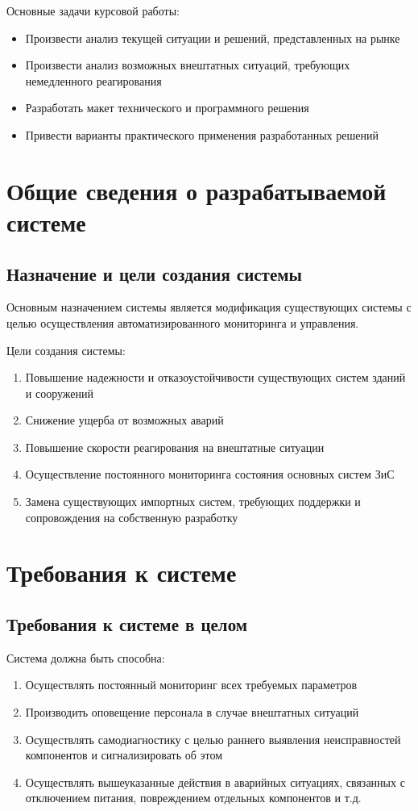 Основные задачи курсовой работы:
\begin{itemize}
	\itemsep0em 
	\item Произвести анализ текущей ситуации и решений, представленных на рынке
	\item Произвести анализ возможных внештатных ситуаций, требующих немедленного реагирования
	\item Разработать макет технического и программного решения
	\item Привести варианты практического применения разработанных решений 
\end{itemize}


\newpage\section{Общие сведения о разрабатываемой системе}
\subsection{Назначение и цели создания системы}
Основным назначением системы является модификация существующих системы с целью осуществления автоматизированного мониторинга и управления.

Цели создания системы:
\begin{enumerate}
	\itemsep0em 
	\item Повышение надежности и отказоустойчивости существующих систем зданий и сооружений
	\item Снижение ущерба от возможных аварий
	\item Повышение скорости реагирования на внештатные ситуации
	\item Осуществление постоянного мониторинга состояния основных систем ЗиС
	\item Замена существующих импортных систем, требующих поддержки и сопровождения на собственную разработку
\end{enumerate}

\section{Требования к системе}
\subsection{Требования к системе в целом}
Система должна быть способна:
\begin{enumerate}
	\itemsep0em 
	\item Осуществлять постоянный мониторинг всех требуемых параметров
	\item Производить оповещение персонала в случае внештатных ситуаций
	\item Осуществлять самодиагностику с целью раннего выявления неисправностей компонентов и сигнализировать об этом
	\item Осуществлять вышеуказанные действия в аварийных ситуациях, связанных с отключением питания, повреждением отдельных компонентов и т.д.
\end{enumerate}

